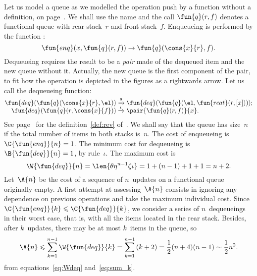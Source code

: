 Let us model a queue as we modelled the operation push by a function
 without a definition, on
page~\pageref{par:stacks}. We shall use the name
 and the call \(\fun{q}(r,f)\) denotes a
functional queue with rear stack~\(r\) and front
stack~\(f\). Enqueueing is performed by the function
:
\begin{equation}
\fun{enq}(x,\fun{q}(r,f)) \rightarrow \fun{q}(\cons{x}{r},f).
\label{def:enq}
\end{equation}
Dequeueing requires the result to be a \emph{pair} made of the dequeued item and the new queue without
it. Actually, the new queue is the first component of the pair, to fit
how the operation is depicted in the figures as a rightwards arrow.
Let us call  the
dequeueing function:
\begin{equation}
\begin{array}{@{}r@{\;}l@{\;}l@{}}
  \fun{deq}(\fun{q}(\cons{x}{r},\el))
& \xrightarrow{\smash{\theta}}
& \fun{deq}(\fun{q}(\el,\fun{rcat}(r,[x])));\\
  \fun{deq}(\fun{q}(r,\cons{x}{f}))
& \xrightarrow{\smash{\iota}}
& \pair{\fun{q}(r,f)}{x}.
\end{array}
\label{def:deq}
\end{equation}
See page~\pageref{def:rev} for the definition~\eqref{def:rev}
of~. We shall say that the queue
has size~\(n\) if the total number of items in both stacks
is~\(n\). The cost of enqueueing is
\(\C{\fun{enq}}{n} = 1\). The minimum
cost for dequeueing is
\(\B{\fun{deq}}{n} = 1\), by rule~\(\iota\). The maximum cost is
\begin{equation}
  \W{\fun{deq}}{n} = \len{\theta\eta^{n-1}\zeta\iota} = 1 + (n-1)
+ 1 + 1 = n + 2. \label{eq:Wdeq}
\end{equation}
Let~\(\A{n}\) be the cost of a sequence of \(n\)~updates on a
functional queue originally empty. A first attempt at
assessing~\(\A{n}\) consists in ignoring any dependence on previous
operations and take the maximum individual cost. Since
\(\C{\fun{enq}}{k} \leqslant \C{\fun{deq}}{k}\), we consider a series
of \(n\)~dequeueings in their worst case, that is, with all the items
located in the rear stack. Besides, after \(k\)~updates, there may be
at most \(k\)~items in the queue, so
\begin{equation}
  \A{n} \leqslant \sum_{k=1}^{n-1}{\W{\fun{deq}}{k}} =
  \sum_{k=1}^{n-1}{(k+2)} =
  \frac{1}{2}(n+4)(n-1) \sim \frac{1}{2}{n^2}.
  \label{ineq:Sn_upper_bound}
\end{equation}
from equations~\eqref{eq:Wdeq} and~\eqref{eq:sum_k}.

